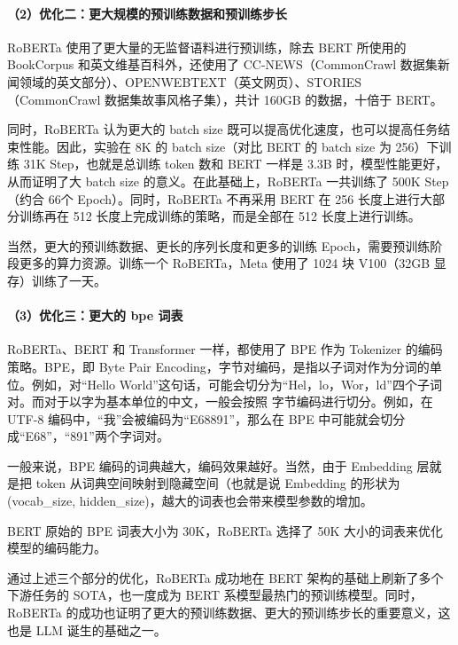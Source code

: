 \documentclass[
]{article}
\begin{document}
\paragraph{（2）优化二：更大规模的预训练数据和预训练步长}\label{ux4f18ux5316ux4e8cux66f4ux5927ux89c4ux6a21ux7684ux9884ux8badux7ec3ux6570ux636eux548cux9884ux8badux7ec3ux6b65ux957f}

RoBERTa 使用了更大量的无监督语料进行预训练，除去 BERT 所使用的
BookCorpus 和英文维基百科外，还使用了 CC-NEWS（CommonCrawl
数据集新闻领域的英文部分）、OPENWEBTEXT（英文网页）、STORIES（CommonCrawl
数据集故事风格子集），共计 160GB 的数据，十倍于 BERT。

同时，RoBERTa 认为更大的 batch size
既可以提高优化速度，也可以提高任务结束性能。因此，实验在 8K 的 batch
size（对比 BERT 的 batch size 为 256）下训练 31K Step，也就是总训练
token 数和 BERT 一样是 3.3B 时，模型性能更好，从而证明了大 batch size
的意义。在此基础上，RoBERTa 一共训练了 500K Step（约合 66个
Epoch）。同时，RoBERTa 不再采用 BERT 在 256 长度上进行大部分训练再在 512
长度上完成训练的策略，而是全部在 512 长度上进行训练。

当然，更大的预训练数据、更长的序列长度和更多的训练
Epoch，需要预训练阶段更多的算力资源。训练一个 RoBERTa，Meta 使用了 1024
块 V100（32GB 显存）训练了一天。

\paragraph{（3）优化三：更大的 bpe
词表}\label{ux4f18ux5316ux4e09ux66f4ux5927ux7684-bpe-ux8bcdux8868}

RoBERTa、BERT 和 Transformer 一样，都使用了 BPE 作为 Tokenizer
的编码策略。BPE，即 Byte Pair
Encoding，字节对编码，是指以子词对作为分词的单位。例如，对``Hello
World''这句话，可能会切分为``Hel，lo，Wor，ld''四个子词对。而对于以字为基本单位的中文，一般会按照
字节编码进行切分。例如，在 UTF-8
编码中，``我''会被编码为``E68891''，那么在 BPE
中可能就会切分成``E68''，``891''两个字词对。

一般来说，BPE 编码的词典越大，编码效果越好。当然，由于 Embedding
层就是把 token 从词典空间映射到隐藏空间（也就是说 Embedding 的形状为
(vocab\_size, hidden\_size)，越大的词表也会带来模型参数的增加。

BERT 原始的 BPE 词表大小为 30K，RoBERTa 选择了 50K
大小的词表来优化模型的编码能力。

通过上述三个部分的优化，RoBERTa 成功地在 BERT
架构的基础上刷新了多个下游任务的 SOTA，也一度成为 BERT
系模型最热门的预训练模型。同时，RoBERTa
的成功也证明了更大的预训练数据、更大的预训练步长的重要意义，这也是 LLM
诞生的基础之一。
\end{document}
